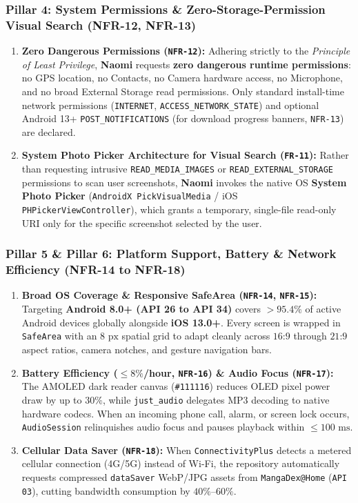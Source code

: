 \subsubsection{Pillar 4: System Permissions \& Zero-Storage-Permission Visual Search (NFR-12, NFR-13)}
\begin{enumerate}
    \item \textbf{Zero Dangerous Permissions (\texttt{NFR-12}):} Adhering strictly to the \textit{Principle of Least Privilege}, \textbf{Naomi} requests \textbf{zero dangerous runtime permissions}: no GPS location, no Contacts, no Camera hardware access, no Microphone, and no broad External Storage read permissions. Only standard install-time network permissions (\texttt{INTERNET}, \texttt{ACCESS\_NETWORK\_STATE}) and optional Android 13+ \texttt{POST\_NOTIFICATIONS} (for download progress banners, \texttt{NFR-13}) are declared.
    \item \textbf{System Photo Picker Architecture for Visual Search (\texttt{FR-11}):} Rather than requesting intrusive \texttt{READ\_\allowbreak MEDIA\_\allowbreak IMAGES} or \texttt{READ\_\allowbreak EXTERNAL\_\allowbreak STORAGE} permissions to scan user screenshots, \textbf{Naomi} invokes the native OS \textbf{System Photo Picker} (\texttt{AndroidX PickVisualMedia} / iOS \texttt{PHPicker\allowbreak ViewController}), which grants a temporary, single-file read-only URI only for the specific screenshot selected by the user.
\end{enumerate}

\subsubsection{Pillar 5 \& Pillar 6: Platform Support, Battery \& Network Efficiency (NFR-14 to NFR-18)}
\begin{enumerate}
    \item \textbf{Broad OS Coverage \& Responsive SafeArea (\texttt{NFR-14}, \texttt{NFR-15}):} Targeting \textbf{Android 8.0+ (API 26 to API 34)} covers $>95.4\%$ of active Android devices globally alongside \textbf{iOS 13.0+}. Every screen is wrapped in \texttt{SafeArea} with an $8\text{ px}$ spatial grid to adapt cleanly across $16\text{:}9$ through $21\text{:}9$ aspect ratios, camera notches, and gesture navigation bars.
    \item \textbf{Battery Efficiency ($\le 8\%$/hour, \texttt{NFR-16}) \& Audio Focus (\texttt{NFR-17}):} The AMOLED dark reader canvas (\texttt{\#111116}) reduces OLED pixel power draw by up to $30\%$, while \texttt{just\_audio} delegates MP3 decoding to native hardware codecs. When an incoming phone call, alarm, or screen lock occurs, \texttt{AudioSession} relinquishes audio focus and pauses playback within $\le 100\text{ ms}$.
    \item \textbf{Cellular Data Saver (\texttt{NFR-18}):} When \texttt{ConnectivityPlus} detects a metered cellular connection (4G/5G) instead of Wi-Fi, the repository automatically requests compressed \texttt{dataSaver} WebP/JPG assets from \texttt{MangaDex@Home} (\texttt{API 03}), cutting bandwidth consumption by $40\%\text{--}60\%$.
\end{enumerate}

